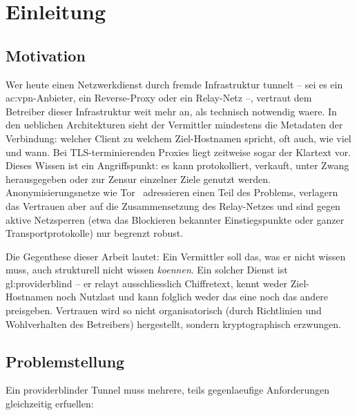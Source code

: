 \chapter{Einleitung}
\label{ch:einleitung}

\section{Motivation}
\label{sec:motivation}

Wer heute einen Netzwerkdienst durch fremde Infrastruktur tunnelt -- sei es
ein \gls{ac:vpn}-Anbieter, ein Reverse-Proxy oder ein Relay-Netz --, vertraut
dem Betreiber dieser Infrastruktur weit mehr an, als technisch notwendig waere.
In den ueblichen Architekturen sieht der Vermittler mindestens die
Metadaten der Verbindung: welcher Client zu welchem Ziel-Hostnamen spricht, oft
auch, wie viel und wann. Bei TLS-terminierenden Proxies liegt zeitweise sogar
der Klartext vor. Dieses Wissen ist ein Angriffspunkt: es kann protokolliert,
verkauft, unter Zwang herausgegeben oder zur Zensur einzelner Ziele genutzt
werden. Anonymisierungsnetze wie Tor~\cite{dingledine2004tor} adressieren einen
Teil des Problems, verlagern das Vertrauen aber auf die Zusammensetzung des
Relay-Netzes und sind gegen aktive Netzsperren (etwa das Blockieren bekannter
Einstiegspunkte oder ganzer Transportprotokolle) nur begrenzt robust.

Die Gegenthese dieser Arbeit lautet: Ein Vermittler soll das, was er nicht
wissen muss, auch strukturell nicht wissen \emph{koennen}. Ein solcher Dienst
ist \gls{gl:providerblind} -- er relayt ausschliesslich Chiffretext, kennt weder
Ziel-Hostnamen noch Nutzlast und kann folglich weder das eine noch das andere
preisgeben. Vertrauen wird so nicht organisatorisch (durch Richtlinien und
Wohlverhalten des Betreibers) hergestellt, sondern kryptographisch erzwungen.

\section{Problemstellung}
\label{sec:problem}

Ein providerblinder Tunnel muss mehrere, teils gegenlaeufige Anforderungen
gleichzeitig erfuellen:

